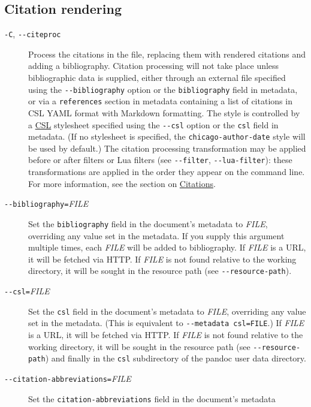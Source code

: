 \documentclass[
  a4paper,
]{article}
\begin{document}
\hypertarget{citation-rendering}{%
\subsection{Citation rendering}\label{citation-rendering}}

\begin{description}
\item[\texttt{-C}, \texttt{-\/-citeproc}]
Process the citations in the file, replacing them with rendered
citations and adding a bibliography. Citation processing will not take
place unless bibliographic data is supplied, either through an external
file specified using the \texttt{-\/-bibliography} option or the
\texttt{bibliography} field in metadata, or via a \texttt{references}
section in metadata containing a list of citations in CSL YAML format
with Markdown formatting. The style is controlled by a
\href{https://docs.citationstyles.org/en/stable/specification.html}{CSL}
stylesheet specified using the \texttt{-\/-csl} option or the
\texttt{csl} field in metadata. (If no stylesheet is specified, the
\texttt{chicago-author-date} style will be used by default.) The
citation processing transformation may be applied before or after
filters or Lua filters (see \texttt{-\/-filter},
\texttt{-\/-lua-filter}): these transformations are applied in the order
they appear on the command line. For more information, see the section
on \protect\hyperlink{citations}{Citations}.
\item[\texttt{-\/-bibliography=}\emph{FILE}]
Set the \texttt{bibliography} field in the document's metadata to
\emph{FILE}, overriding any value set in the metadata. If you supply
this argument multiple times, each \emph{FILE} will be added to
bibliography. If \emph{FILE} is a URL, it will be fetched via HTTP. If
\emph{FILE} is not found relative to the working directory, it will be
sought in the resource path (see \texttt{-\/-resource-path}).
\item[\texttt{-\/-csl=}\emph{FILE}]
Set the \texttt{csl} field in the document's metadata to \emph{FILE},
overriding any value set in the metadata. (This is equivalent to
\texttt{-\/-metadata\ csl=FILE}.) If \emph{FILE} is a URL, it will be
fetched via HTTP. If \emph{FILE} is not found relative to the working
directory, it will be sought in the resource path (see
\texttt{-\/-resource-path}) and finally in the \texttt{csl} subdirectory
of the pandoc user data directory.
\item[\texttt{-\/-citation-abbreviations=}\emph{FILE}]
Set the \texttt{citation-abbreviations} field in the document's metadata

\end{description}
\end{document}

